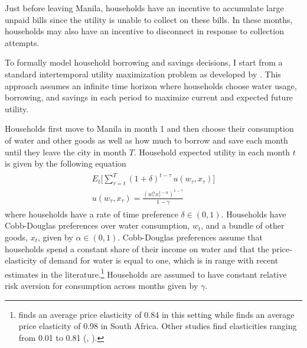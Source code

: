 \documentclass[12pt]{article}
\begin{document}
Just before leaving Manila, households have an incentive to accumulate large unpaid bills since the utility is unable to collect on these bills.  In these months, households may also have an incentive to disconnect in response to collection attempts.

To formally model household borrowing and savings decisions, I start from a standard intertemporal utility maximization problem as developed by \cite{deaton1991saving}.  This approach assumes an infinite time horizon where households choose water usage, borrowing, and savings in each period to maximize current and expected future utility.  

Households first move to Manila in month 1 and then choose their consumption of water and other goods as well as how much to borrow and save each month until they leave the city in month $T$.  Household expected utility in each month $t$ is given by the following equation
\begin{align}\label{eq:u}
\begin{split}
E_t \Big[ \sum_{\tau = t}^{T} (1+\delta)^{t-\tau} \, u(w_{\tau},x_{\tau}) \Big]\\
u(w_{\tau},x_{\tau}) = \frac{(w_{\tau}^{\alpha}x_{\tau}^{1-\alpha})^{1-\gamma}}{1-\gamma} 
\end{split} 
\end{align}
where households have a rate of time preference $\delta \in (0,1)$.  Households have Cobb-Douglas preferences over water consumption, $w_{t}$, and a bundle of other goods, $x_{t}$, given by $\alpha \in (0,1)$.  Cobb-Douglas preferences assume that households spend a constant share of their income on water and that the price-elasticity of demand for water is equal to one, which is in range with recent estimates in the literature.\footnote{\cite{wjv} finds an average price elasticity of 0.84 in this setting while \cite{szabo2015value} finds an average price elasticity of 0.98 in South Africa.  Other studies find elasticities ranging from 0.01 to 0.81 (\cite{diakite2009proposal}, \cite{strand2005water}).} Households are assumed to have constant relative risk aversion for consumption across months given by $\gamma$.
\end{document}
